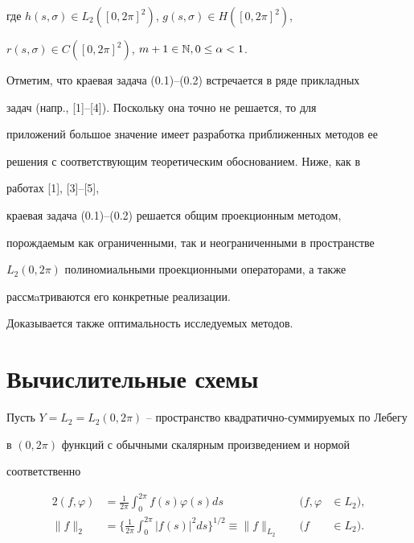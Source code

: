 где $h(s,\sigma)\in L_2([0,2\pi ]^2)$, $g(s,\sigma)\in H([0,2\pi]^2)$,


$r(s,\sigma)\in C([0,2\pi]^2)$, $m+1\in \Bbb N, 0\leq \alpha <1$.





Отметим, что краевая задача (0.1)--(0.2) встречается в ряде прикладных


задач (напр., [1]--[4]). Поскольку она точно не решается, то для


приложений большое значение имеет разработка приближенных методов ее


решения с соответствующим теоретическим обоснованием. Ниже, как в


работах [1], [3]--[5],


краевая задача (0.1)--(0.2) решается общим проекционным методом,


порождаемым как ограниченными, так и неограниченными в пространстве


$L_2(0,2\pi )$ полиномиальными проекционными операторами, а также


рассмaтриваются его конкретные реализации.


Доказывается также оптимальность исследуемых методов.





\section{Вычислительные схемы}





Пусть $Y=L_2=L_2(0,2\pi )$ -- пространство квадратично-суммируемых по Лебегу


в $(0,2\pi )$ функций с обычными скалярным произведением и нормой


соответственно


\begin{alignat*}{2}


(f,\varphi )&=\frac{1}{2\pi }\int_0^{2\pi }f(s)\varphi (s) ds


&\quad (f,\varphi &\in L_2), \\


%


\|f\|_2&=\bigg\{\frac{1}{2\pi }\int_0^{2\pi }|f(s)|^2 ds\bigg\}^{1/2}


\equiv \|f\|_{L_2}&\quad (f&\in L_2).


\end{alignat*}





